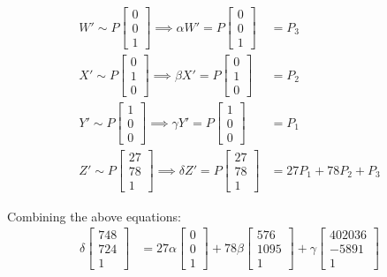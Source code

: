 \documentclass[12pt, oneside]{article}
\begin{document}
\begin{align*}
  W' \sim P
   \begin{bmatrix}
  0   \\
  0   \\
  1  
  \end{bmatrix} \implies 
  \alpha W' = P
   \begin{bmatrix}
  0   \\
  0   \\
  1  
  \end{bmatrix}  &= P_3 \\
  X' \sim P
   \begin{bmatrix}
  0   \\
  1   \\
  0  
  \end{bmatrix} \implies 
  \beta X' = P
   \begin{bmatrix}
  0   \\
  1   \\
  0  
  \end{bmatrix}  &= P_2 \\
  Y' \sim P
   \begin{bmatrix}
  1   \\
  0   \\
  0  
  \end{bmatrix} \implies 
  \gamma Y' = P
   \begin{bmatrix}
  1   \\
  0   \\
  0  
  \end{bmatrix}   &= P_1 \\
  Z' \sim P
   \begin{bmatrix}
  27   \\
  78   \\
  1  
  \end{bmatrix} \implies 
  \delta Z' = P
   \begin{bmatrix}
  27   \\
  78   \\
  1  
  \end{bmatrix}   &= 27 P_1 + 78 P_2 + P_3
  \end{align*}
  
  Combining the above equations:
  \begin{align*}
  \delta  \begin{bmatrix}
  748   \\
  724   \\
  1  
  \end{bmatrix}  &= 27\alpha  \begin{bmatrix}
  0  \\
  0   \\
  1  
  \end{bmatrix} +
  78\beta \begin{bmatrix}
  576   \\
  1095   \\
  1  
  \end{bmatrix} + \gamma  \begin{bmatrix}
    402036  \\
    -5891 \\
    1 
\end{bmatrix}
  \end{align*} 
\end{document}

